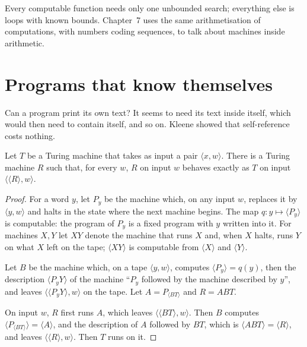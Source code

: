 Every computable function needs only one unbounded search; everything else is loops with known bounds. Chapter~7 uses the same arithmetisation of computations, with numbers coding sequences, to talk about machines inside arithmetic.

\section{Programs that know themselves}\label{sec:recursion}

Can a program print its own text? It seems to need its text inside itself, which would then need to contain itself, and so on. Kleene showed that self-reference costs nothing.

\begin{theorem}\label{thm:recursion}
Let $T$ be a Turing machine that takes as input a pair $\langle x,w\rangle$. There is a Turing machine $R$ such that, for every $w$, $R$ on input $w$ behaves exactly as $T$ on input $\langle\langle R\rangle,w\rangle$.
\end{theorem}

\begin{proof}
For a word $y$, let $P_y$ be the machine which, on any input $w$, replaces it by $\langle y,w\rangle$ and halts in the state where the next machine begins. The map $q:y\mapsto\langle P_y\rangle$ is computable: the program of $P_y$ is a fixed program with $y$ written into it. For machines $X,Y$ let $XY$ denote the machine that runs $X$ and, when $X$ halts, runs $Y$ on what $X$ left on the tape; $\langle XY\rangle$ is computable from $\langle X\rangle$ and $\langle Y\rangle$.

Let $B$ be the machine which, on a tape $\langle y,w\rangle$, computes $\langle P_y\rangle=q(y)$, then the description $\langle P_yY\rangle$ of the machine ``$P_y$ followed by the machine described by $y$'', and leaves $\langle\langle P_yY\rangle,w\rangle$ on the tape. Let $A=P_{\langle BT\rangle}$ and $R=ABT$.

On input $w$, $R$ first runs $A$, which leaves $\langle\langle BT\rangle,w\rangle$. Then $B$ computes $\langle P_{\langle BT\rangle}\rangle=\langle A\rangle$, and the description of $A$ followed by $BT$, which is $\langle ABT\rangle=\langle R\rangle$, and leaves $\langle\langle R\rangle,w\rangle$. Then $T$ runs on it.
\end{proof}


